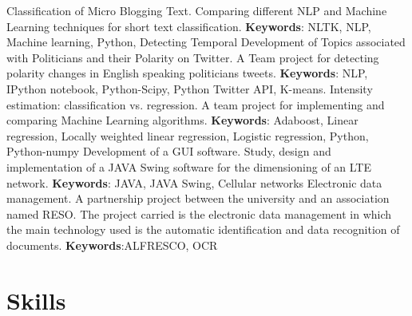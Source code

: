 \documentclass[11pt,a4paper,sans]{moderncv}        %
\begin{document}
				{Classification of Micro Blogging Text. 
				\newline{}
				Comparing different NLP and Machine Learning techniques for short text classification.
				\newline{}
				\textbf{Keywords}: NLTK, NLP, Machine learning, Python,  
				}		
				{Detecting Temporal Development of Topics associated with Politicians and their Polarity on Twitter. 
				\newline{}
				A Team project for detecting polarity changes in English speaking politicians tweets.
				\newline{}
				\textbf{Keywords}: NLP, IPython notebook, Python-Scipy, Python Twitter API, K-means.
				}		
				{Intensity estimation: classification vs. regression. 
				\newline{}
				A team project for implementing and comparing Machine Learning algorithms.
				\newline{}
				\textbf{Keywords}: Adaboost, Linear regression, Locally weighted linear regression, Logistic regression, Python, Python-numpy
				}
				{Development of a GUI software. 
				\newline{}
				Study, design and implementation of a JAVA Swing software for the dimensioning of an LTE network.
				\newline{}
				\textbf{Keywords}: JAVA, JAVA Swing, Cellular networks
				}
				{Electronic data management.  
				\newline{}
				A partnership project between the university and an association named RESO. The project carried is the electronic data management in which the main technology used is the automatic identification and data recognition of documents.			
				\newline{}
				\textbf{Keywords}:ALFRESCO, OCR
				}
	
	\section{Skills}
	
\end{document}

